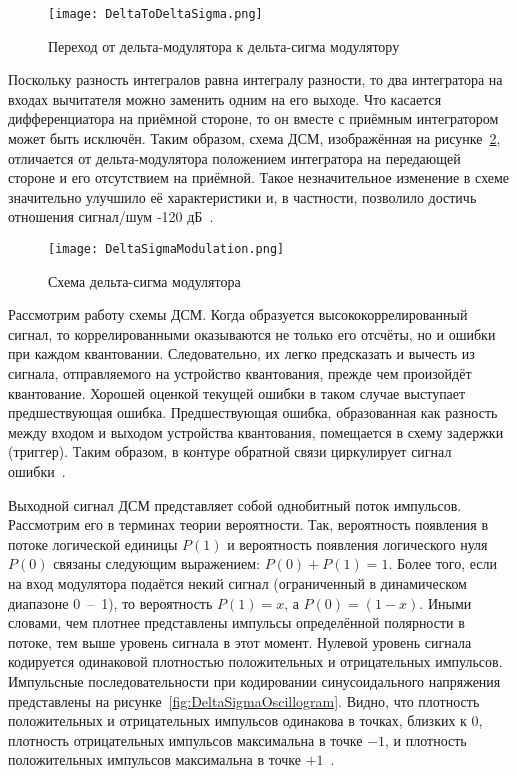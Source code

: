 \begin{figure}[ht]
	\centering
	\texttt{[image: DeltaToDeltaSigma.png]}  
	\caption{Переход от дельта-модулятора к дельта-сигма модулятору}
	\label{fig:DeltaToDeltaSigma}
\end{figure}

Поскольку разность интегралов равна интегралу разности, то два интегратора на входах вычитателя можно заменить одним на его выходе. Что касается дифференциатора на приёмной стороне, то он вместе с приёмным интегратором может быть исключён. Таким образом, схема ДСМ, изображённая на рисунке~\ref{fig:DeltaSigmaModulation}, отличается от дельта-модулятора положением интегратора на передающей стороне и его отсутствием на приёмной. Такое незначительное изменение в схеме значительно улучшило её характеристики и, в частности, позволило достичь отношения сигнал/шум -120 дБ~\cite{KitE_DeltaSigma}.

\begin{figure}[ht]
	\centering
	\texttt{[image: DeltaSigmaModulation.png]}  
	\caption{Схема дельта-сигма модулятора}
	\label{fig:DeltaSigmaModulation}
\end{figure}

Рассмотрим работу схемы ДСМ. Когда образуется высококоррелированный сигнал, то коррелированными оказываются не только его отсчёты, но и ошибки при каждом квантовании. Следовательно, их легко предсказать и вычесть из сигнала, отправляемого на устройство квантования, прежде чем произойдёт квантование. Хорошей оценкой текущей ошибки в таком случае выступает предшествующая ошибка. Предшествующая ошибка, образованная как разность между входом и выходом устройства квантования, помещается в схему задержки (триггер). Таким образом, в контуре обратной связи циркулирует сигнал ошибки~\cite{KitE_DeltaSigma}.

Выходной сигнал ДСМ представляет собой однобитный поток импульсов. Рассмотрим его в терминах теории вероятности. Так, вероятность появления в потоке логической единицы $P(1)$ и вероятность появления логического нуля $P(0)$ связаны следующим выражением: $P(0)+P(1) = 1$. Более того, если на вход модулятора подаётся некий сигнал (ограниченный в динамическом диапазоне 0~--~1), то вероятность $P(1)=x$, а $P(0)=(1-x)$. Иными словами, чем плотнее представлены импульсы определённой полярности в потоке, тем выше уровень сигнала в этот момент. Нулевой уровень сигнала кодируется одинаковой плотностью положительных и отрицательных импульсов. Импульсные последовательности при кодировании синусоидального напряжения представлены на рисунке~\ref{fig:DeltaSigmaOscillogram}. Видно, что плотность положительных и отрицательных импульсов одинакова в точках, близких к 0, плотность отрицательных импульсов максимальна в точке $-1$, и плотность положительных импульсов максимальна в точке $+1$~\cite{KitE_DeltaSigma}.

